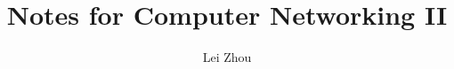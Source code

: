 \documentclass{article}
\begin{document}
\title{Notes for Computer Networking II}
\author{Lei Zhou}
\maketitle

%

\end{document}
